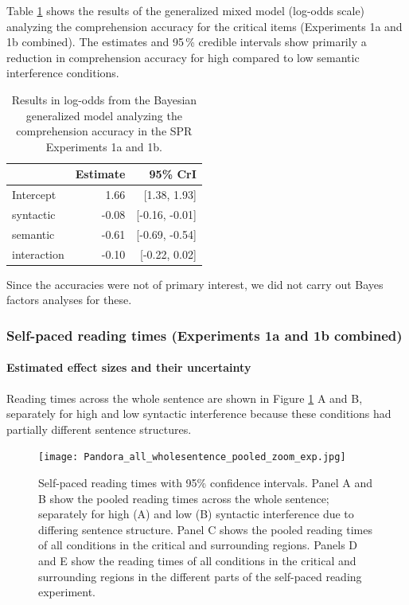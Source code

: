 \documentclass[review,preprint,12pt,authoryear,floatsintext]{elsarticle}
\begin{document}
Table \ref{tab:spr_acc_mod} shows the results of the generalized mixed model (log-odds scale) analyzing the comprehension accuracy for the critical items (Experiments 1a and 1b combined). The estimates and 95\,\% credible intervals show primarily a reduction in comprehension accuracy for high compared to low semantic interference conditions.

\begin{table}[ht]
    \caption{Results in log-odds from the Bayesian generalized model analyzing the comprehension accuracy in the SPR Experiments 1a and 1b.}
    \label{tab:spr_acc_mod}
    \centering
    \begin{tabular}{lrr}
    \toprule
    & Estimate &  95\% CrI  \\
    \midrule
Intercept& 1.66 &   [1.38, 1.93]\\
syntactic& -0.08 &  [-0.16, -0.01]\\
semantic&  -0.61 & [-0.69, -0.54]\\
interaction& -0.10&  [-0.22, 0.02]\\
    \bottomrule
    \end{tabular}
\end{table}

Since the accuracies were not of primary interest, we did not carry out Bayes factors analyses for these.

\subsubsection{Self-paced reading times (Experiments 1a and 1b combined)}

\paragraph{Estimated effect sizes and their uncertainty}

\label{trim} Reading times across the whole sentence are shown in Figure \ref{fig:whole_sentence} A and B, separately for high and low syntactic interference because these conditions had partially different sentence structures. 

{
\begin{figure}
    \caption{Self-paced reading times with 95\% confidence intervals. Panel A and B show the pooled reading times across the whole sentence; separately for high (A) and low (B) syntactic interference due to differing sentence structure. Panel C shows the pooled reading times of all conditions in the critical and surrounding regions. Panels D and E show the reading times of all conditions in the critical and surrounding regions in the different parts of the self-paced reading experiment.}
    \label{fig:whole_sentence}
    \centering
    \texttt{[image: Pandora\_all\_wholesentence\_pooled\_zoom\_exp.jpg]}
\end{figure}
\clearpage}
\end{document}
